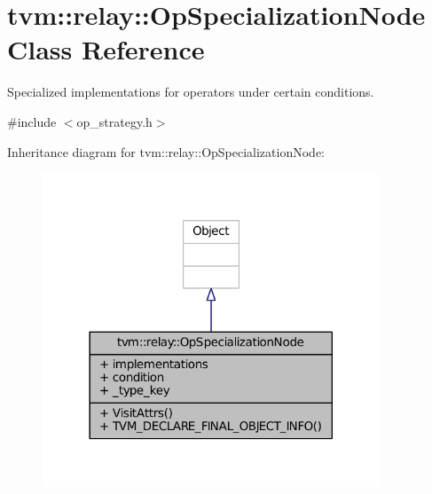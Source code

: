 \hypertarget{classtvm_1_1relay_1_1OpSpecializationNode}{}\section{tvm\+:\+:relay\+:\+:Op\+Specialization\+Node Class Reference}
\label{classtvm_1_1relay_1_1OpSpecializationNode}


Specialized implementations for operators under certain conditions.  




{\ttfamily \#include $<$op\+\_\+strategy.\+h$>$}



Inheritance diagram for tvm\+:\+:relay\+:\+:Op\+Specialization\+Node\+:
\nopagebreak
\begin{figure}[H]
\begin{center}
\leavevmode
\includegraphics[width=285pt]{classtvm_1_1relay_1_1OpSpecializationNode__inherit__graph}
\end{center}
\end{figure}


